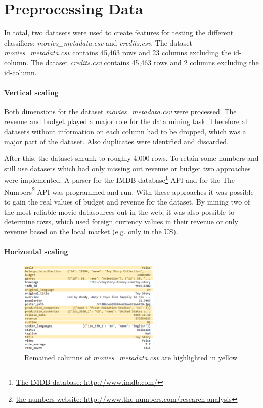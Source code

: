 \section{Preprocessing Data}
\label{cha:preprocessing}

In total, two datasets were used to create features for testing the different classifiers:
\textit{movies\_metadata.csv} and \textit{credits.csv}. The dataset \textit{movies\_metadata.csv} contains 45,463 rows and 23 columns excluding the id-column. The dataset \textit{credits.csv} contains 45,463 rows and 2 columns excluding the id-column.

\paragraph{Vertical scaling}
Both dimensions for the dataset \textit{movies\_metadata.csv} were processed. The revenue and budget played a major role for the data mining task. Therefore all datasets without information on each column had to be dropped, which was a major part of the dataset. Also duplicates were identified and discarded. 
 
After this, the dataset shrunk to roughly 4,000 rows. To retain some numbers and still use datasets which had only missing out revenue or budget two approaches were implemented: A parser for the IMDB database\footnote{
\hyperref{http://www.imdb.com/}{external_sources}{ref:IMDB}{The IMDB database: http://www.imdb.com/}} API and for the The Numbers\footnote{\hyperref{http://www.the-numbers.com/research-analysis}{external_sources}{ref:numbers}{the numbers website: http://www.the-numbers.com/research-analysis}} API was programmed and run. With these approaches it was possible to gain the real values of budget and revenue for the dataset. By mining two of the most reliable movie-datasources out in the web, it was also possible to determine rows, which used foreign currency values in their revenue or only revenue based on the local market (e.g. only in the US).

\paragraph{Horizontal scaling}
\begin{figure}
	\includegraphics[width=0.6\textwidth]{images/3_metadata_columns.png}
	\caption{Remained columns of \textit{movies\_metadata.csv} are highlighted in yellow}
	\label{img:mm_columns}
\end{figure}

